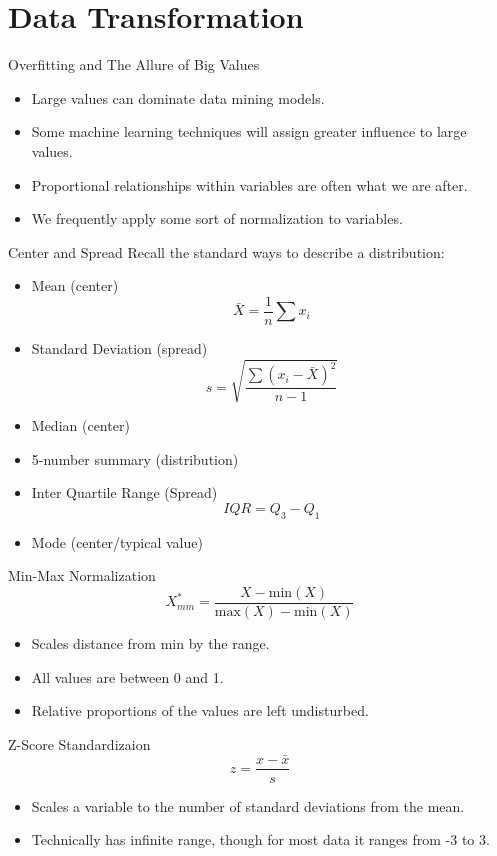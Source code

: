 \documentclass[handout]{beamer}
\begin{document}
\section{Data Transformation}
\begin{frame}{Overfitting and The Allure of Big Values}
\begin{itemize}[<+->]
  \item Large values can dominate data mining models.
  \item Some machine learning techniques will assign greater influence to large values.
  \item Proportional relationships within variables are often what we are after.
  \item We frequently apply some sort of normalization to variables.
\end{itemize}
\end{frame}

\begin{frame}{Center and Spread}
Recall the standard ways to describe a distribution: 
\begin{itemize}[<+->]
  \item Mean (center)
  \[
  \bar{X}=\displaystyle\frac{1}{n}\sum x_i
  \]
  \item Standard Deviation (spread)
  \[
  s = \sqrt{\displaystyle\frac{\sum (x_i-\bar{X})^2}{n-1}}
  \]
  \item Median (center)
  \item 5-number summary (distribution)
  \item Inter Quartile Range (Spread)
  \[
  IQR = Q_3 - Q_1
  \]
  \item Mode (center/typical value)
\end{itemize}
\end{frame}

\begin{frame}{Min-Max Normalization}
\[
X^*_{mm} = \displaystyle\frac{X - \mathrm{min}(X)}{\mathrm{max}(X) - \mathrm{min}(X)}
\]
\begin{itemize}[<+->]
\item Scales distance from min by the range.
\item All values are between 0 and 1.
\item Relative proportions of the values are left undisturbed.
\end{itemize}
\end{frame}

\begin{frame}{Z-Score Standardizaion}
\[
z = \displaystyle\frac{x-\bar{x}}{s}
\]
\begin{itemize}[<+->]
  \item Scales a variable to the number of standard deviations from the mean.
  \item Technically has infinite range, though for most data it ranges from -3 to 3.
\end{itemize}
\end{frame}
\end{document}
